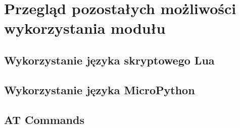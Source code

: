 \chapter{Przegląd pozostałych możliwości wykorzystania modułu}
\label{inne}

\section{Wykorzystanie języka skryptowego Lua}
\label{lua}


\section{Wykorzystanie języka MicroPython}
\label{micropython}


\section{AT Commands}
\label{AT}

